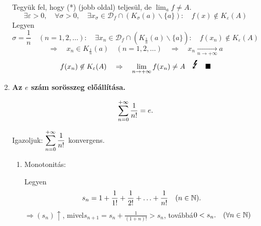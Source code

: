 \documentclass[a4paper,11.5pt]{article}
\begin{document}
\begin{enumerate}
		Tegyük fel, hogy (*) (jobb oldal) teljesül, de $\displaystyle\lim_af\not=A$.
		\[ \exists \varepsilon>0,\quad \forall \sigma>0,\quad \exists x_\sigma \in \mathcal{D}_f\cap(K_\sigma(a)\backslash\{a\}):\quad f(x)\not\in K_\varepsilon(A) \]
		Legyen
		\[\sigma=\frac{1}{n}\quad (n=1,2,\ldots):\quad \exists x_n\in\mathcal{D}_f\cap(K_{\frac{1}{n}}(a)\backslash\{a\}):\quad f(x_n)\not\in K_\varepsilon(A)\]
		\[\Rightarrow\quad x_n\in K_{\frac{1}{n}}(a)\quad (n=1,2,\ldots)\quad \Rightarrow\quad x_n\underset{n\to+\infty}{\longrightarrow} a\]
		\[f(x_n)\not\in K_\varepsilon(A)\quad \Rightarrow\quad \lim_{n\to+\infty}f(x_n)\not=A  \quad \text{{\LARGE\Lightning}}\quad \blacksquare\]
		
		\item \textbf{Az $e$ szám sorösszeg előállítása.}
		
		\[\displaystyle\sum_{n=0}^{+\infty} \frac{1}{n!}=e.\]
		
		\biz 
		
		Igazoljuk: $\displaystyle\sum_{n=0}^{+\infty}\frac{1}{n!}$ konvergens.
		
		\begin{enumerate}
			\medskip
			\item Monotonitás: 
			
			Legyen
			\[ s_n=1+\frac{1}{1!}+\frac{1}{2!}+\ldots+\frac{1}{n!}\quad (n\in\mathbb{N}). \]
			$\Rightarrow (s_n)\uparrow$, \quad mivel\quad  $s_{n+1}=s_n\displaystyle+\frac{1}{(1+n)!}>s_n$, \quad továbbá\quad $0<s_n.\quad (\forall n \in \mathbb{N})$
			

\end{enumerate}
\end{enumerate}
\end{document}
